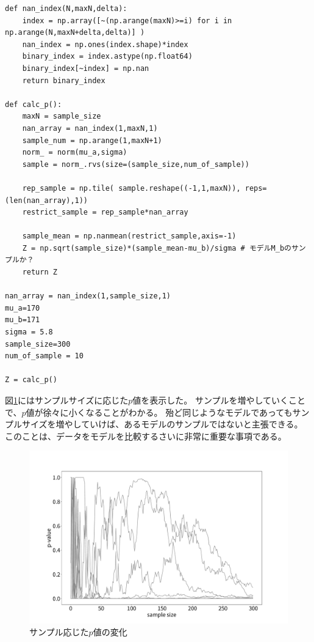 \begin{lstlisting}
def nan_index(N,maxN,delta):
    index = np.array([~(np.arange(maxN)>=i) for i in np.arange(N,maxN+delta,delta)] )
    nan_index = np.ones(index.shape)*index
    binary_index = index.astype(np.float64)
    binary_index[~index] = np.nan
    return binary_index

def calc_p():
    maxN = sample_size
    nan_array = nan_index(1,maxN,1)
    sample_num = np.arange(1,maxN+1)
    norm_ = norm(mu_a,sigma)
    sample = norm_.rvs(size=(sample_size,num_of_sample))

    rep_sample = np.tile( sample.reshape((-1,1,maxN)), reps= (len(nan_array),1))
    restrict_sample = rep_sample*nan_array

    sample_mean = np.nanmean(restrict_sample,axis=-1)
    Z = np.sqrt(sample_size)*(sample_mean-mu_b)/sigma # モデルM_bのサンプルか？
    return Z

nan_array = nan_index(1,sample_size,1)
mu_a=170
mu_b=171
sigma = 5.8
sample_size=300
num_of_sample = 10

Z = calc_p()
\end{lstlisting}

図\ref{fig:time_series_p_value_depends_sample_size}にはサンプルサイズに応じた$p$値を表示した。
サンプルを増やしていくことで、$p$値が徐々に小くなることがわかる。
殆ど同じようなモデルであってもサンプルサイズを増やしていけば、あるモデルのサンプルではないと主張できる。
このことは、データをモデルを比較するさいに非常に重要な事項である。
\begin{figure}
 \begin{center}
  \includegraphics[width=15cm]{./image/04_/p_sample_size.pdf}
  \caption{サンプル応じた$p$値の変化}
  \label{fig:time_series_p_value_depends_sample_size}
 \end{center}
\end{figure}



